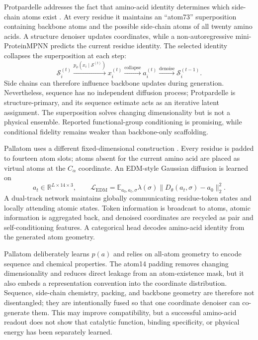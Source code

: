 \documentclass[10pt]{article}
\newcommand{\E}{\mathbb E}
\newcommand{\R}{\mathbb R}
\begin{document}
Protpardelle addresses the fact that amino-acid identity determines which side-chain atoms exist
\cite{chu2024}.  At every residue it maintains an ``atom73'' superposition containing backbone
atoms and the possible side-chain atoms of all twenty amino acids.  A structure denoiser updates
coordinates, while a non-autoregressive mini-ProteinMPNN predicts the current residue identity.
The selected identity collapses the superposition at each step:
\begin{equation}
\mathcal S_i^{(t)}
\xrightarrow{p_\phi(x_i\mid\mathcal S^{(t)})}
x_i^{(t)}
\xrightarrow{\mathrm{collapse}}
a_i^{(t)}
\xrightarrow{\mathrm{denoise}}
\mathcal S_i^{(t-1)}.
\label{eq:protpardelle-superposition}
\end{equation}
Side chains can therefore influence backbone updates during generation.  Nevertheless, sequence
has no independent diffusion process; Protpardelle is structure-primary, and its sequence estimate
acts as an iterative latent assignment.  The superposition solves changing dimensionality but is not
a physical ensemble.  Reported functional-group conditioning is promising, while conditional
fidelity remains weaker than backbone-only scaffolding.

Pallatom uses a different fixed-dimensional construction \cite{qu2024}.  Every residue is padded to
fourteen atom slots; atoms absent for the current amino acid are placed as virtual atoms at the
$C_\alpha$ coordinate.  An EDM-style Gaussian diffusion is learned on
\begin{equation}
a_t\in\R^{L\times14\times3},
\qquad
\mathcal L_{\mathrm{EDM}}
=\E_{a_0,a_t,\sigma}
\lambda(\sigma)\|D_\theta(a_t,\sigma)-a_0\|_2^2.
\label{eq:pallatom-loss}
\end{equation}
A dual-track network maintains globally communicating residue-token states and locally attending
atomic states.  Token information is broadcast to atoms, atomic information is aggregated back,
and denoised coordinates are recycled as pair and self-conditioning features.  A categorical head
decodes amino-acid identity from the generated atom geometry.

Pallatom deliberately learns $p(a)$ and relies on all-atom geometry to encode sequence and chemical
properties.  The atom14 padding removes changing dimensionality and reduces direct leakage from an
atom-existence mask, but it also embeds a representation convention into the coordinate
distribution.  Sequence, side-chain chemistry, packing, and backbone geometry are therefore not
disentangled; they are intentionally fused so that one coordinate denoiser can co-generate them.
This may improve compatibility, but a successful amino-acid readout does not show that catalytic
function, binding specificity, or physical energy has been separately learned.
\end{document}
